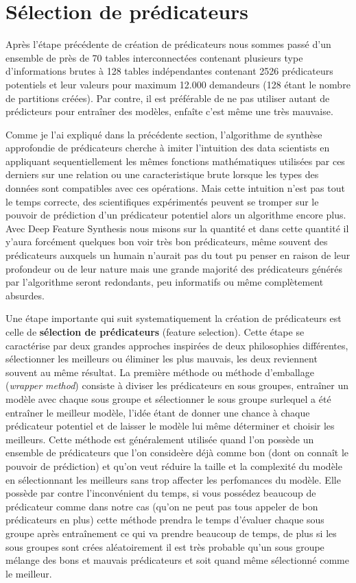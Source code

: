 \section{Sélection de prédicateurs}
\label{chap3.section2}
Après l'étape précédente de création de prédicateurs nous sommes passé d'un ensemble de près de 70 tables interconnectées contenant plusieurs type d'informations brutes à 128 tables indépendantes contenant 2526 prédicateurs potentiels et leur valeurs pour maximum 12.000 demandeurs (128 étant le nombre de partitions créées). Par contre, il est préférable de ne pas utiliser autant de prédicteurs pour entraîner des modèles, enfaîte c'est même une très mauvaise.

Comme je l'ai expliqué dans la précédente section, l'algorithme de synthèse approfondie de prédicateurs cherche à imiter l'intuition des data scientists en appliquant sequentiellement les mêmes fonctions mathématiques utilisées par ces derniers sur une relation ou une caracteristique brute lorsque les types des données sont compatibles avec ces opérations. Mais cette intuition n'est pas tout le temps correcte, des scientifiques expérimentés peuvent se tromper sur le pouvoir de prédiction d'un prédicateur potentiel alors un algorithme encore plus. Avec Deep Feature Synthesis nous misons sur la quantité et dans cette quantité il y'aura forcément quelques bon voir très bon prédicateurs, même souvent des prédicateurs auxquels un humain n'aurait pas du tout pu penser en raison de leur profondeur ou de leur nature mais une grande majorité des prédicateurs générés par l'algorithme seront redondants, peu informatifs ou même complètement absurdes.

Une étape importante qui suit systematiquement la création de prédicateurs est celle de \textbf{sélection de prédicateurs} (feature selection). Cette étape se caractérise par deux grandes approches inspirées de deux philosophies différentes, sélectionner les meilleurs ou éliminer les plus mauvais, les deux reviennent souvent au même résultat. La première méthode ou méthode d'emballage (\textit{wrapper method}) consiste à diviser les prédicateurs en sous groupes, entraîner un modèle avec chaque sous groupe et sélectionner le sous groupe surlequel a été entraîner le meilleur modèle, l'idée étant de donner une chance à chaque prédicateur potentiel et de laisser le modèle lui même déterminer et choisir les meilleurs. Cette méthode est généralement utilisée quand l'on possède un ensemble de prédicateurs que l'on consideère déjà comme bon (dont on connaît le pouvoir de prédiction) et qu'on veut réduire la taille et la complexité du modèle en sélectionnant les meilleurs sans trop affecter les perfomances du modèle. Elle possède par contre l'inconvénient du temps, si vous possédez beaucoup de prédicateur comme dans notre cas (qu'on ne peut pas tous appeler de bon prédicateurs en plus) cette méthode prendra le temps d'évaluer chaque sous groupe après entraînement ce qui va prendre beaucoup de temps, de plus si les sous groupes sont crées aléatoirement il est très probable qu'un sous groupe mélange des bons et mauvais prédicateurs et soit quand même sélectionné comme le meilleur.


